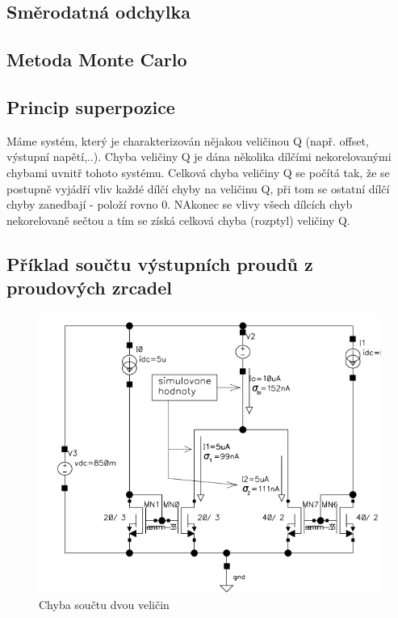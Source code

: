 \subsection{Směrodatná odchylka}

\subsection{Metoda Monte Carlo}


\subsection{Princip superpozice}
Máme systém, který je charakterizován nějakou veličinou Q (např. offset, výstupní napětí,..). Chyba veličiny Q je dána několika dílčími nekorelovanými chybami uvnitř tohoto systému. Celková chyba veličiny Q se počítá tak, že se postupně vyjádří vliv každé dílčí chyby na veličinu Q, při tom se ostatní dílčí chyby zanedbají - položí rovno 0. NAkonec se vlivy všech dílcích chyb nekorelovaně sečtou a tím se získá celková chyba (rozptyl) veličiny Q.

\subsection{Příklad součtu výstupních proudů z proudových zrcadel}

\begin{figure}[h]
   \begin{center}
     \includegraphics[scale=0.5]{images/Chyba_Souctu.png}
   \end{center}
   \caption{Chyba součtu dvou veličin}
\end{figure}

